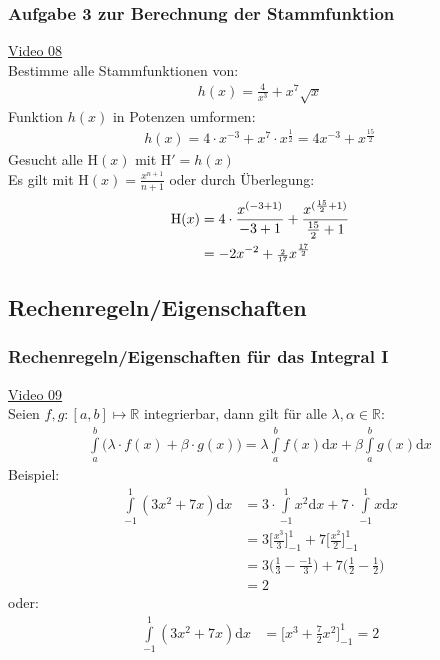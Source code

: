 \subsubsection{ Aufgabe 3 zur Berechnung der Stammfunktion}
\href{https://youtu.be/JBw8qcuJTRA}{Video 08}\\
Bestimme alle Stammfunktionen von:\\ 
\begin{align*}
h(x)=\frac{4}{x^3}+x^7\sqrt{x}
\end{align*}
Funktion $ h(x) $ in Potenzen umformen:\\
\begin{align*}
h(x)=4\cdot x^{-3}+x^7\cdot x^{\frac{1}{2}}=4x^{-3}+x^{\frac{15}{2}}
\end{align*}
Gesucht alle $ \mathrm{H}(x) $ mit $ \mathrm{H}'=h(x) $\\
Es gilt mit $ \mathrm{H}(x)=\frac{x^{n+1}}{n+1} $ oder durch Überlegung:\\
\begin{align*}
\mathrm{H}(x)&=4\cdot \frac{x^{(-3+1)}}{-3+1}+\frac{x^{(\frac{15}{2}+1)}}{\frac{15}{2}+1}\\
&=-2x^{-2}+\genfrac{}{}{}{2}{2 }{17}x^{\frac{17}{2}}
\end{align*}
\subsection{Rechenregeln/Eigenschaften   }
\subsubsection{Rechenregeln/Eigenschaften für das Integral I }
\href{https://youtu.be/aP327zIKmvI}{Video 09}\\
Seien $ f,g:[a,b] \longmapsto \mathbb{R}$ integrierbar, dann gilt für alle $ \lambda,\alpha\in\mathbb{R} $:\\
\begin{align*}
\int\limits_{a}^{b}\bigg( \lambda\cdot f(x)+\beta\cdot g(x)\bigg)=\lambda\int\limits_{a}^{b} f(x)\mathrm{d}x+\beta\int\limits_{a}^{b} g(x)\mathrm{d}x
\end{align*}
Beispiel:\\
\begin{align*}
\int\limits_{-1}^{1}(3x^2+7x) \mathrm{d}x&=3\cdot \int\limits_{-1}^{1} x^2\mathrm{d}x+7\cdot\int\limits_{-1}^{1} x\mathrm{d}x\\
&=3\bigg[\frac{x^3}{3}\bigg]^1_{-1}+7\bigg[\frac{x^2}{2}\bigg]^1_{-1}\\
&=3\bigg(\frac{1}{3}-\frac{-1}{3}\bigg)+7\bigg(\frac{1}{2}-\frac{1}{2}\bigg)\\
&=2
\end{align*}
oder:\\
\begin{align*}
\int\limits_{-1}^{1}(3x^2+7x) \mathrm{d}x&=\bigg[x^3+\frac{7}{2}x^2\bigg]^1_{-1}=2
\end{align*}
\newpage
\noindent
